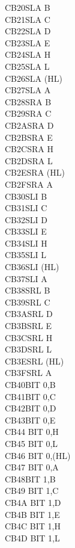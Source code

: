 \begin{multicols}{3}
{\begin{tabbing}
	CB20\>SLA B\\
	CB21\>SLA C\\
	CB22\>SLA D\\
	CB23\>SLA E\\
	CB24\>SLA H\\
	CB25\>SLA L\\
	CB26\>SLA (HL)\\
	CB27\>SLA A\\
	CB28\>SRA B\\
	CB29\>SRA C\\
	CB2A\>SRA D\\
	CB2B\>SRA E\\
	CB2C\>SRA H\\
	CB2D\>SRA L\\
	CB2E\>SRA (HL)\\
	CB2F\>SRA A\\
	CB30\>SLI B\UNDOC\\
	CB31\>SLI C\UNDOC\\
	CB32\>SLI D\UNDOC\\
	CB33\>SLI E\UNDOC\\
	CB34\>SLI H\UNDOC\\
	CB35\>SLI L\UNDOC\\
	CB36\>SLI (HL)\UNDOC\\
	CB37\>SLI A\UNDOC\\
	CB38\>SRL B\\
	CB39\>SRL C\\
	CB3A\>SRL D\\
	CB3B\>SRL E\\
	CB3C\>SRL H\\
	CB3D\>SRL L\\
	CB3E\>SRL (HL)\\
	CB3F\>SRL A\\
	CB40\>BIT 0,B\\
	CB41\>BIT 0,C\\
	CB42\>BIT 0,D\\
	CB43\>BIT 0,E\\
	CB44\> 	BIT 0,H\\
	CB45\> 	BIT 0,L\\
	CB46\> 	BIT 0,(HL)\\
	CB47\> 	BIT 0,A\\
	CB48\>BIT 1,B\\
	CB49\> 	BIT 1,C\\
	CB4A\> 	BIT 1,D\\
	CB4B\> 	BIT 1,E\\
	CB4C\> 	BIT 1,H\\
	CB4D\> 	BIT 1,L\\

\end{tabbing}}
\end{multicols}
